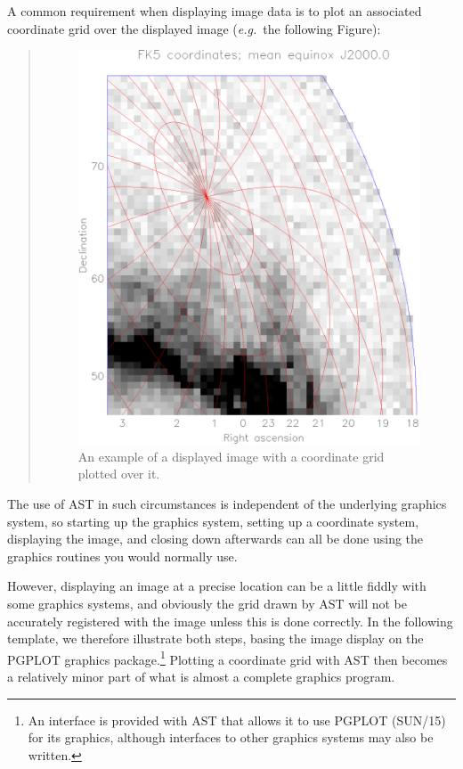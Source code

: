 \documentclass[twoside,11pt]{article}
\newcommand{\xref}[3]{#1}
\begin{document}
\begin{htmlonly}
   A common requirement when displaying image data is to plot an
   associated coordinate grid over the displayed image ({\em{e.g.}}\
   the following Figure):
   \begin{quote}
   \begin{figure}[bhtp]
   \label{fig:overgrid}
   \includegraphics[scale=0.8]{sun210_figures/overgrid.eps}
   \caption{An example of a displayed image with a coordinate grid
   plotted over it.}
   \end{figure}
   \end{quote}
\end{htmlonly}
The use of AST in such circumstances is independent of the underlying
graphics system, so starting up the graphics system, setting up a
coordinate system, displaying the image, and closing down afterwards
can all be done using the graphics routines you would normally use.

However, displaying an image at a precise location can be a little
fiddly with some graphics systems, and obviously the grid drawn by AST
will not be accurately registered with the image unless this is done
correctly. In the following template, we therefore illustrate both
steps, basing the image display on the PGPLOT graphics
package.\footnote{An interface is provided with AST that allows it to
use PGPLOT (\xref{SUN/15}{sun15}{}) for its graphics, although
interfaces to other graphics systems may also be written.}  Plotting a
coordinate grid with AST then becomes a relatively minor part of what
is almost a complete graphics program.
\end{document}
